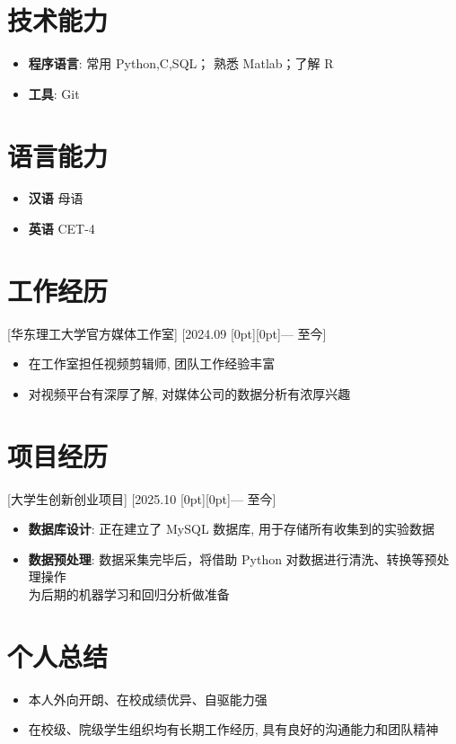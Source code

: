 \documentclass{resume}
\begin{document}
\section{技术能力}
\begin{itemize}
  \item \textbf{程序语言}: 常用 Python,C,SQL； 熟悉 Matlab；了解 R
  \item \textbf{工具}: Git
\end{itemize}

\section{语言能力}

\begin{itemize}
  \item \textbf{汉语} \quad 母语
  \item \textbf{英语} \quad CET-4
\end{itemize}

\section{工作经历}

[华东理工大学官方媒体工作室]
[2024.09   \raisebox{0.2ex}[0pt][0pt]{{\small —}} 至今]

\begin{itemize}
  \item 在工作室担任视频剪辑师, 团队工作经验丰富
  \item 对视频平台有深厚了解, 对媒体公司的数据分析有浓厚兴趣
\end{itemize}

\section{项目经历}

[大学生创新创业项目]
[2025.10   \raisebox{0.2ex}[0pt][0pt]{{\small —}} 至今]

\begin{itemize}
  \item \textbf{数据库设计}: 正在建立了 MySQL 数据库, 用于存储所有收集到的实验数据
  \item \textbf{数据预处理}: 数据采集完毕后，将借助 Python 对数据进行清洗、转换等预处理操作 \\
      \hspace*{5.71em}为后期的机器学习和回归分析做准备 %
\end{itemize}


\section{个人总结}

\begin{itemize}
  \item 本人外向开朗、在校成绩优异、自驱能力强
  \item 在校级、院级学生组织均有长期工作经历, 具有良好的沟通能力和团队精神
\end{itemize}
\end{document}

